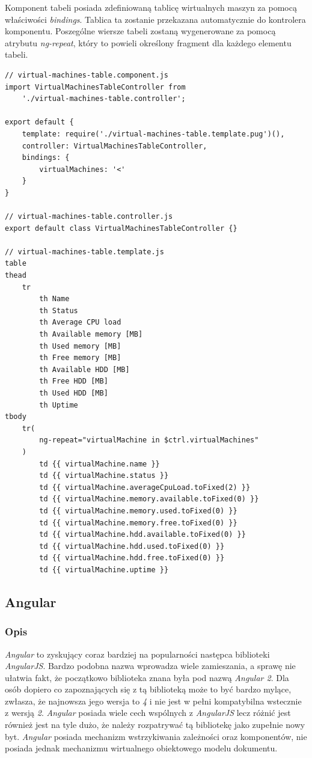 \documentclass[polish, twoside, 12pt]{mwart}
\begin{document}
Komponent tabeli posiada zdefiniowaną tablicę wirtualnych maszyn za pomocą właściwości \emph{bindings}. Tablica ta zostanie przekazana automatycznie do kontrolera komponentu. Poszególne wiersze tabeli zostaną wygenerowane za pomocą atrybutu \emph{ng-repeat}, który to powieli określony fragment dla każdego elementu tabeli.

\begin{lstlisting}[caption=Komponent tabeli]
// virtual-machines-table.component.js
import VirtualMachinesTableController from
    './virtual-machines-table.controller';

export default {
    template: require('./virtual-machines-table.template.pug')(),
    controller: VirtualMachinesTableController,
    bindings: {
        virtualMachines: '<'
    }
}

// virtual-machines-table.controller.js
export default class VirtualMachinesTableController {}

// virtual-machines-table.template.js
table
thead
    tr
        th Name
        th Status
        th Average CPU load
        th Available memory [MB]
        th Used memory [MB]
        th Free memory [MB]
        th Available HDD [MB]
        th Free HDD [MB]
        th Used HDD [MB]
        th Uptime
tbody
    tr(
        ng-repeat="virtualMachine in $ctrl.virtualMachines"
    )
        td {{ virtualMachine.name }}
        td {{ virtualMachine.status }}
        td {{ virtualMachine.averageCpuLoad.toFixed(2) }}
        td {{ virtualMachine.memory.available.toFixed(0) }}
        td {{ virtualMachine.memory.used.toFixed(0) }}
        td {{ virtualMachine.memory.free.toFixed(0) }}
        td {{ virtualMachine.hdd.available.toFixed(0) }}
        td {{ virtualMachine.hdd.used.toFixed(0) }}
        td {{ virtualMachine.hdd.free.toFixed(0) }}
        td {{ virtualMachine.uptime }}
\end{lstlisting}

\subsection{Angular}

\subsubsection{Opis}

\emph{Angular} \cite{angular} to zyskujący coraz bardziej na popularności następca biblioteki \emph{AngularJS}. Bardzo podobna nazwa wprowadza wiele zamieszania, a sprawę nie ułatwia fakt, że początkowo biblioteka znana była pod nazwą \emph{Angular 2}. Dla osób dopiero co zapoznających się z tą biblioteką może to być bardzo mylące, zwłasza, że najnowsza jego wersja to \emph{4} i nie jest w pełni kompatybilna wstecznie z wersją \emph{2}. \emph{Angular} posiada wiele cech wspólnych z \emph{AngularJS} lecz różnić jest również jest na tyle dużo, że należy rozpatrywać tą bibliotekę jako zupełnie nowy byt. \emph{Angular} posiada mechanizm wstrzykiwania zależności oraz komponentów, nie posiada jednak mechanizmu wirtualnego obiektowego modelu dokumentu.
\end{document}
